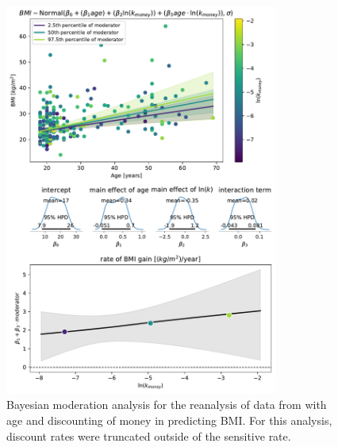 \documentclass[12pt, a4paper]{article}
\begin{document}
\begin{figure} 
	\centering
	\includegraphics[width=0.8\textwidth]{veillard_vincent_2020_reanalysis/veillard_vincent_reanalysis_truncated_money.pdf} 
	\caption{Bayesian moderation analysis for the reanalysis of data from \cite{VeillardVincent2020} with age and discounting of money in predicting BMI. For this analysis, discount rates were truncated outside of the sensitive rate.}
	\label{fig:vv_money_trunc}
\end{figure}
\end{document}
